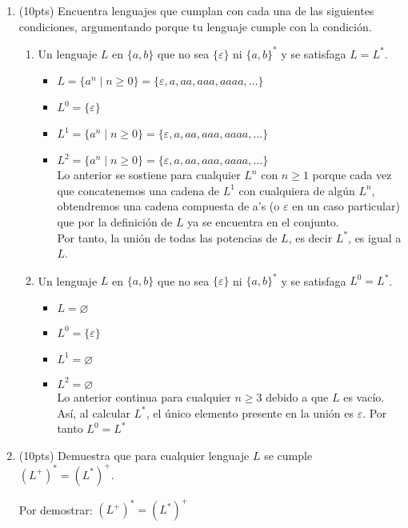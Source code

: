 \documentclass{article}
\begin{document}
\begin{enumerate}
    \item (10pts) Encuentra lenguajes que cumplan con cada una de las siguientes condiciones, argumentando porque tu lenguaje cumple con la condición.
    \begin{enumerate}
        \item Un lenguaje $L$ en $\{a, b\}$ que no sea $\{\varepsilon\}$ ni $\{a, b\}^*$ y se satisfaga $L = L^*$.
        \begin{itemize}
            \item $L = \{a^n \mid n \geq 0\} = \{\varepsilon, a, aa, aaa, aaaa, ...\}$
            \item $L^0 = \{\varepsilon\}$
            \item $L^1 = \{a^n \mid n \geq 0\} = \{\varepsilon, a, aa, aaa, aaaa, ...\}$
            \item $L^2 = \{a^n \mid n \geq 0\} = \{\varepsilon, a, aa, aaa, aaaa, ...\}$ \\
            Lo anterior se sostiene para cualquier $L^n$ con $n \geq 1$ porque cada vez que concatenemos una cadena de $L^1$ con cualquiera de algún $L^n$, obtendremos una cadena compuesta de a's (o $\varepsilon$ en un caso particular) que por la definición de $L$ ya se encuentra en el conjunto.\\
            Por tanto, la unión de todas las potencias de $L$, es decir $L^*$, es igual a $L$.
        \end{itemize}
        \item Un lenguaje $L$ en $\{a, b\}$ que no sea $\{\varepsilon\}$ ni $\{a, b\}^*$ y se satisfaga $L^0 = L^*$.
        \begin{itemize}
            \item $L = \varnothing$
            \item $L^0 = \{\varepsilon\}$
            \item $L^1 = \varnothing$
            \item $L^2 = \varnothing$ \\
            Lo anterior continua para cualquier $n \geq 3$ debido a que $L$ es vacío. Así, al calcular $L^*$, el único elemento presente en la unión es $\varepsilon$. Por tanto $L^0 = L^*$
        \end{itemize}
    \end{enumerate}
    
    \item (10pts) Demuestra que para cualquier lenguaje $L$ se cumple $(L^+)^* = (L^*)^+$.
    
    Por demostrar: $(L^+)^* = (L^*)^+$ 


\end{enumerate}
\end{document}
